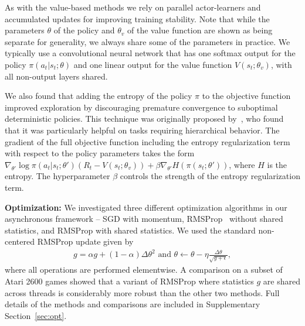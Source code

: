 As with the value-based methods we rely on parallel actor-learners and accumulated updates for improving training stability.
Note that while the parameters $\theta$ of the policy and $\theta_v$ of the value function are shown as being separate for generality, we always share some of the parameters in practice.
We typically use a convolutional neural network that has one softmax output for the policy $\pi(a_t|s_t;\theta)$ and one linear output for the value function $V(s_t;\theta_v)$, with all non-output layers shared.

We also found that adding the entropy of the policy $\pi$ to the objective function improved exploration by discouraging premature convergence to suboptimal deterministic policies.
This technique was originally proposed by~\citep{williams1991function}, who found that it was particularly helpful on tasks requiring hierarchical behavior.
The gradient of the full objective function including the entropy regularization term with respect to the policy parameters takes the form
%
$\nabla_{\theta'} \log\pi(a_t|s_t;\theta') (R_t - V(s_t;\theta_v)) + \beta \nabla_{\theta'} H(\pi(s_t;\theta'))$,
%
where $H$ is the entropy.  The hyperparameter $\beta$ controls the strength of the entropy regularization term.


%
\textbf{Optimization:}
We investigated three different optimization algorithms in our asynchronous framework -- SGD with momentum, RMSProp~\citep{tieleman2012lecture} without shared statistics, and RMSProp with shared statistics.
We used the standard non-centered RMSProp update given by
\begin{eqnarray}
\label{eq-rmsprop}
g = \alpha g + (1-\alpha)\Delta\theta^2 \text{ and } \theta \gets \theta - \eta \frac{\Delta\theta}{\sqrt{g+\epsilon}},
\end{eqnarray}
where all operations are performed elementwise.
A comparison on a subset of Atari 2600 games showed that a variant of RMSProp where statistics $g$ are shared across threads is considerably more robust than the other two methods.
Full details of the methods and comparisons are included in Supplementary Section~\ref{sec:opt}.
